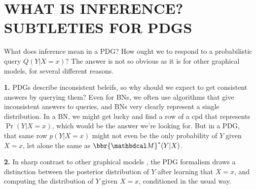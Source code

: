 \documentclass[twoside]{article}
\begin{document}
\section{WHAT IS INFERENCE? SUBTLETIES FOR PDGS}

What does inference mean in a PDG?
How ought we to respond to a probabilistic query $Q(Y|X{=}x)$?
The answer is not so obvious as it is for other graphical models,
for several different reasons.

\textbf{1.}
PDGs describe inconsistent beleifs,
so why should we expect to get consistent answers by querying them?
Even for BNs, we often use algorithms that give inconsistent answers to queries, and BNs very clearly represent a single distribution.
%
In a BN, we might get lucky and find a row of a cpd that represents $\Pr(Y|X{=}x)$, which would be the answer we're looking for.
But in a PDG, that same row  $p(Y | X{=}x)$ might not even be the only probability of $Y$ given $X{=}x$, let alone the same as $\bbr{\dg M}^*(Y|X)$.

\textbf{2.}
In sharp contrast to other graphical models \parencite[pg 26]{koller2009probabilistic},
the PDG formalism draws a distinction between
the posterior distribution of $Y$ after learning that $X{=}x$,
and computing the distribution of $Y$ given $X{=}x$, conditioned in the usual way.
\end{document}
